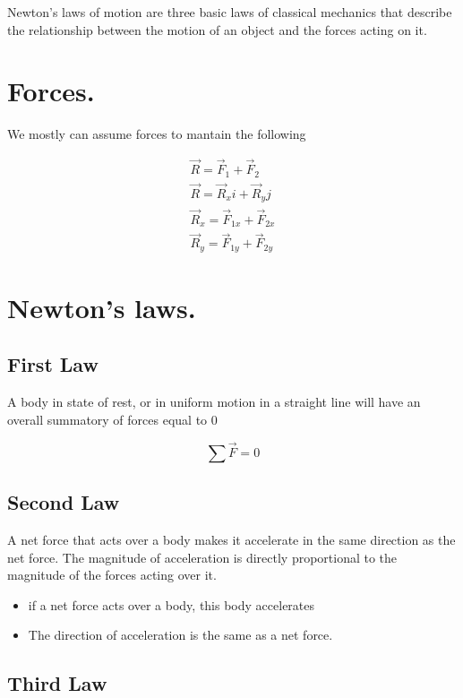 \documentclass[11pt,fleqn]{book} %
\begin{document}
Newton's laws of motion are three basic laws of classical mechanics that describe the relationship between the motion of an object and the forces acting on it.

\section{Forces.}

We mostly can assume forces to mantain the following

\begin{gather}
    \vec{R} = \vec{F}_1 + \vec{F}_2\\
    \vec{R} = \vec{R}_x i + \vec{R}_y j\\
    \vec{R}_x = \vec{F}_{1x} + \vec{F}_{2x} \\
    \vec{R}_y = \vec{F}_{1y} + \vec{F}_{2y}
\end{gather}

\section{Newton's laws.}

\subsection{First Law}

A body in state of rest, or in uniform motion in a straight line
will have an overall summatory of forces equal to 0

\begin{equation}
    \sum \vec{F} = 0
\end{equation}

\subsection{Second Law}

A net force that acts over a body makes it accelerate in the same direction
as the net force. The magnitude of acceleration is directly proportional
to the magnitude of the forces acting over it.

\begin{itemize}
    \item if a net force acts over a body, this body accelerates
    \item The direction of acceleration is the same as a net force.
\end{itemize}

\subsection{Third Law}
\end{document}
